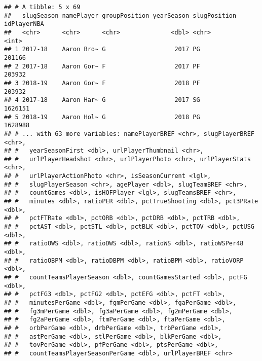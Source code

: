 \documentclass[]{article}
\newenvironment{Shaded}{\begin{snugshade}}{\end{snugshade}}
\newcommand{\KeywordTok}[1]{\textcolor[rgb]{0.13,0.29,0.53}{\textbf{#1}}}
\newcommand{\DataTypeTok}[1]{\textcolor[rgb]{0.13,0.29,0.53}{#1}}
\newcommand{\DecValTok}[1]{\textcolor[rgb]{0.00,0.00,0.81}{#1}}
\newcommand{\StringTok}[1]{\textcolor[rgb]{0.31,0.60,0.02}{#1}}
\newcommand{\OperatorTok}[1]{\textcolor[rgb]{0.81,0.36,0.00}{\textbf{#1}}}
\newcommand{\NormalTok}[1]{#1}
\begin{document}
\begin{verbatim}
## # A tibble: 5 x 69
##   slugSeason namePlayer groupPosition yearSeason slugPosition idPlayerNBA
##   <chr>      <chr>      <chr>              <dbl> <chr>              <int>
## 1 2017-18    Aaron Bro~ G                   2017 PG                201166
## 2 2017-18    Aaron Gor~ F                   2017 PF                203932
## 3 2018-19    Aaron Gor~ F                   2018 PF                203932
## 4 2017-18    Aaron Har~ G                   2017 SG               1626151
## 5 2018-19    Aaron Hol~ G                   2018 PG               1628988
## # ... with 63 more variables: namePlayerBREF <chr>, slugPlayerBREF <chr>,
## #   yearSeasonFirst <dbl>, urlPlayerThumbnail <chr>,
## #   urlPlayerHeadshot <chr>, urlPlayerPhoto <chr>, urlPlayerStats <chr>,
## #   urlPlayerActionPhoto <chr>, isSeasonCurrent <lgl>,
## #   slugPlayerSeason <chr>, agePlayer <dbl>, slugTeamBREF <chr>,
## #   countGames <dbl>, isHOFPlayer <lgl>, slugTeamsBREF <chr>,
## #   minutes <dbl>, ratioPER <dbl>, pctTrueShooting <dbl>, pct3PRate <dbl>,
## #   pctFTRate <dbl>, pctORB <dbl>, pctDRB <dbl>, pctTRB <dbl>,
## #   pctAST <dbl>, pctSTL <dbl>, pctBLK <dbl>, pctTOV <dbl>, pctUSG <dbl>,
## #   ratioOWS <dbl>, ratioDWS <dbl>, ratioWS <dbl>, ratioWSPer48 <dbl>,
## #   ratioOBPM <dbl>, ratioDBPM <dbl>, ratioBPM <dbl>, ratioVORP <dbl>,
## #   countTeamsPlayerSeason <dbl>, countGamesStarted <dbl>, pctFG <dbl>,
## #   pctFG3 <dbl>, pctFG2 <dbl>, pctEFG <dbl>, pctFT <dbl>,
## #   minutesPerGame <dbl>, fgmPerGame <dbl>, fgaPerGame <dbl>,
## #   fg3mPerGame <dbl>, fg3aPerGame <dbl>, fg2mPerGame <dbl>,
## #   fg2aPerGame <dbl>, ftmPerGame <dbl>, ftaPerGame <dbl>,
## #   orbPerGame <dbl>, drbPerGame <dbl>, trbPerGame <dbl>,
## #   astPerGame <dbl>, stlPerGame <dbl>, blkPerGame <dbl>,
## #   tovPerGame <dbl>, pfPerGame <dbl>, ptsPerGame <dbl>,
## #   countTeamsPlayerSeasonPerGame <dbl>, urlPlayerBREF <chr>
\end{verbatim}

\begin{Shaded}
\end{Shaded}
\end{document}
